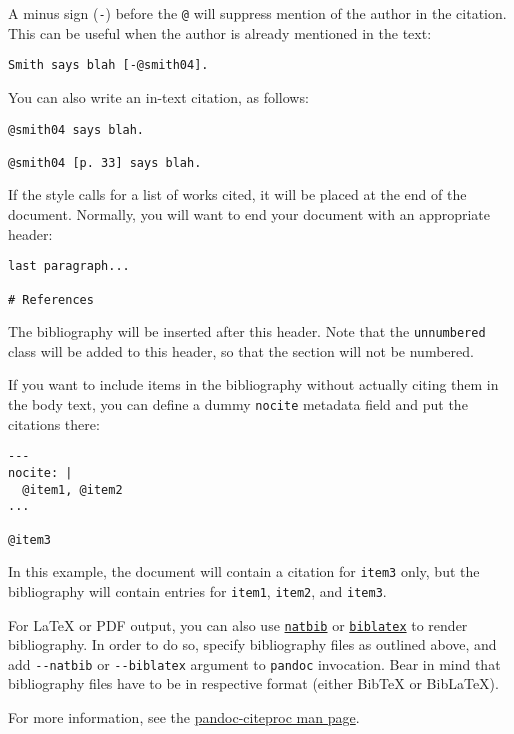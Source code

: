 \documentclass[]{article}
\begin{document}
A minus sign (\texttt{-}) before the \texttt{@} will suppress mention of
the author in the citation. This can be useful when the author is
already mentioned in the text:

\begin{verbatim}
Smith says blah [-@smith04].
\end{verbatim}

You can also write an in-text citation, as follows:

\begin{verbatim}
@smith04 says blah.

@smith04 [p. 33] says blah.
\end{verbatim}

If the style calls for a list of works cited, it will be placed at the
end of the document. Normally, you will want to end your document with
an appropriate header:

\begin{verbatim}
last paragraph...

# References
\end{verbatim}

The bibliography will be inserted after this header. Note that the
\texttt{unnumbered} class will be added to this header, so that the
section will not be numbered.

If you want to include items in the bibliography without actually citing
them in the body text, you can define a dummy \texttt{nocite} metadata
field and put the citations there:

\begin{verbatim}
---
nocite: |
  @item1, @item2
...

@item3
\end{verbatim}

In this example, the document will contain a citation for \texttt{item3}
only, but the bibliography will contain entries for \texttt{item1},
\texttt{item2}, and \texttt{item3}.

For LaTeX or PDF output, you can also use
\href{https://ctan.org/pkg/natbib}{\texttt{natbib}} or
\href{https://ctan.org/pkg/biblatex}{\texttt{biblatex}} to render
bibliography. In order to do so, specify bibliography files as outlined
above, and add \texttt{-\/-natbib} or \texttt{-\/-biblatex} argument to
\texttt{pandoc} invocation. Bear in mind that bibliography files have to
be in respective format (either BibTeX or BibLaTeX).

For more information, see the
\href{https://github.com/jgm/pandoc-citeproc/blob/master/man/pandoc-citeproc.1.md}{pandoc-citeproc
man page}.
\end{document}
